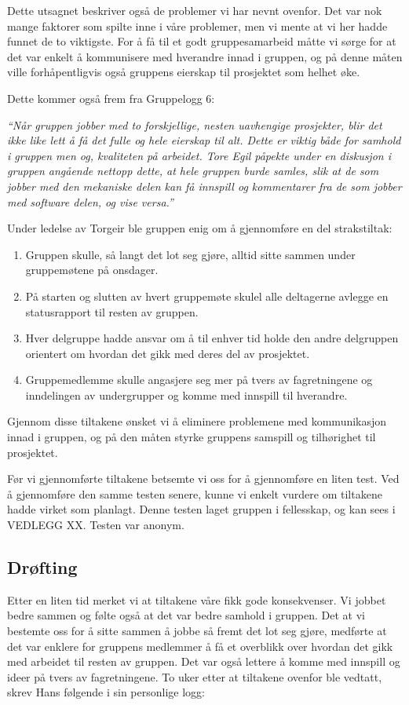 Dette utsagnet beskriver også de problemer vi har nevnt ovenfor. Det var nok mange faktorer som spilte inne i våre problemer, men vi mente at vi her hadde funnet de to viktigste. For å få til et godt gruppesamarbeid måtte vi sørge for at det var enkelt å kommunisere med hverandre innad i gruppen, og på denne måten ville forhåpentligvis også gruppens eierskap til prosjektet som helhet øke.

Dette kommer også frem fra Gruppelogg 6:\newline

\emph{``Når gruppen jobber med to forskjellige, nesten uavhengige prosjekter, blir det ikke like lett å få det fulle og hele eierskap til alt. Dette er viktig både for samhold i gruppen men og, kvaliteten på arbeidet. Tore Egil påpekte under en diskusjon i gruppen angående nettopp dette, at hele gruppen burde samles, slik at de som jobber med den mekaniske delen kan få innspill og kommentarer fra de som jobber med software delen, og vise versa.''}\newline

Under ledelse av Torgeir ble gruppen enig om å gjennomføre en del strakstiltak:

\begin{enumerate}
\item Gruppen skulle, så langt det lot seg gjøre, alltid sitte sammen under gruppemøtene på onsdager. 
\item På starten og slutten av hvert gruppemøte skulel alle deltagerne avlegge en statusrapport til resten av gruppen. 
\item Hver delgruppe hadde ansvar om å til enhver tid holde den andre delgruppen orientert om hvordan det gikk med deres del av prosjektet.
\item Gruppemedlemme skulle angasjere seg mer på tvers av fagretningene og inndelingen av undergrupper og komme med innspill til hverandre. 
\end{enumerate}

Gjennom disse tiltakene ønsket vi å eliminere problemene med kommunikasjon innad i gruppen, og på den måten styrke gruppens samspill og tilhørighet til prosjektet.\newline

Før vi gjennomførte tiltakene betsemte vi oss for å gjennomføre en liten test. Ved å gjennomføre den samme testen senere, kunne vi enkelt vurdere om tiltakene hadde virket som planlagt. Denne testen laget gruppen i fellesskap, og kan sees i VEDLEGG XX. Testen var anonym.
\subsection{Drøfting}
Etter en liten tid merket vi at tiltakene våre fikk gode konsekvenser. Vi jobbet bedre sammen og følte også at det var bedre samhold i gruppen. 
Det at vi bestemte oss for å sitte sammen å jobbe så fremt det lot seg gjøre, medførte at det var enklere for gruppens medlemmer å få et overblikk over hvordan det gikk med arbeidet til resten av gruppen. Det var også lettere å komme med innspill og ideer på tvers av fagretningene. 
To uker etter at tiltakene ovenfor ble vedtatt, skrev Hans følgende i sin personlige logg:\newline

